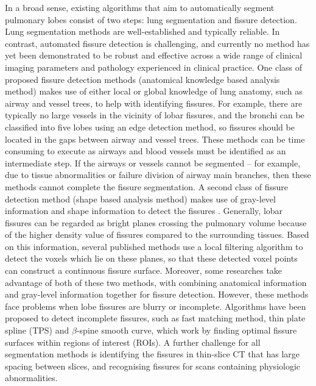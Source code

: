 \documentclass[]{spie}  %
\begin{document}
In a broad sense, existing algorithms that aim to automatically segment pulmonary lobes consist of two steps: lung segmentation and fissure detection. Lung segmentation methods are well-established and typically reliable\cite{hu2001automatic, ukil2005smoothing, sun20063d, pu2008adaptive, wang2009automated, sun2012automated}. In contrast, automated fissure detection is challenging, and currently no method has yet been demonstrated to be robust and effective across a wide range of clinical imaging parameters and pathology experienced in clinical practice. One class of proposed fissure detection methods (anatomical knowledge based analysis method) makes use of either local or global knowledge of lung anatomy, such as airway and vessel trees, to help with identifying fissures\cite{kuhnigk2005informatics, zhou2004automatic, saita2006algorithm, ukil2009anatomy, pu2009computational, lassen2010automatic, doel2012pulmonary, lassen2013automatic}. For example, there are typically no large vessels in the vicinity of lobar fissures, and the bronchi can be classified into five lobes using an edge detection method, so fissures should be located in the gaps between airway and vessel trees. These methods can be time consuming to execute as airways and blood vessels must be identified as an intermediate step. If the airways or vessels cannot be segmented – for example, due to tissue abnormalities or failure division of airway main branches, then these methods cannot complete the fissure segmentation. A second class of fissure detection method (shape based analysis method) makes use of gray-level information and shape information to detect the fissures \cite{wiemker2005unsupervised, van2008supervised, van2010automatic, ross2010automatic, kitasaka2006recognition, lassen2011interactive, doel2012pulmonary, lassen2013automatic, ross2013pulmonary}. Generally, lobar fissures can be regarded as bright planes crossing the pulmonary volume because of the higher density value of fissures compared to the surrounding tissues. Based on this information, several published methods use a local filtering algorithm to detect the voxels which lie on these planes, so that these detected voxel points can construct a continuous fissure surface. Moreover, some researches take advantage of both of these two methods, with combining anatomical information and gray-level information together for fissure detection\cite{ukil2009anatomy, doel2012pulmonary, lassen2013automatic}. However, these methods face problems when lobe fissures are blurry or incomplete. Algorithms have been proposed to detect incomplete fissures, such as fast matching method\cite{ukil2009anatomy}, thin plate spline (TPS)\cite{ross2013pulmonary} and $\beta$-spine smooth curve\cite{doel2012pulmonary}, which work by finding optimal fissure surfaces within regions of interest (ROIs). A further challenge for all segmentation methods is identifying the fissures in thin-slice CT that has large spacing between slices, and recognising fissures for scans containing physiologic abnormalities.
\end{document}
